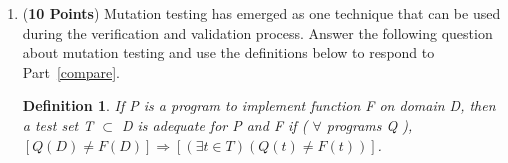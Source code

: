 \documentclass[12pt,epsf,psfig,graphics]{article}
\newtheorem{define}{Definition}
\begin{document}
\begin{enumerate}
\begin{figure}[h]
\vspace*{-.2in}

\caption{Program that Should Calculate the Velocity of an Object.}
\label{pie_code}
\end{figure}

\begin{enumerate}

\item \label{need_code} ({\bf 10 Points}) The general formula for calculating
the kinetic energy of an object is 
\( kinetic=\frac{1}{2}mass\times velocity^2 \).  Thus, the equation for the 
{\tt velocity} variable should be 
\( velocity=sqrt(2 \times (kinetic / mass)) \).  At the {\tt [*]} position
inside of the code, we see that the calculation for {\tt velocity\_squared}
includes a $3$ instead of a $2$.  Using the following scenarios, describe the 
execution of the program in Figure~\ref{pie_code}.   Make sure that you 
clearly state whether the provided inputs will isolate the defect located at
the {\tt [*]} position inside of the code.


\begin{itemize}

\item Scenario 1: input 5 0
\item Scenario 2: input 0 5
\item Scenario 3: input 1000 5
\item Scenario 4: input 8 1

\end{itemize}

\end{enumerate}

\newpage

\item ({\bf 10 Points}) Mutation testing has emerged as one technique
  that can be used during the verification and validation process.
  Answer the following question about mutation testing and use the
  definitions below to respond to Part~\ref{compare}.

\begin{define}

If P is a program to implement function F on domain D, then a test set
T $ \subset $ D is adequate for P and F if ( $\forall$ programs Q ),
$[Q(D) \neq F(D) ] \Rightarrow [(\exists t \in T) (Q(t) \neq F(t))]$.

\label{adeq}
\end{define}


\end{enumerate}
\end{document}
